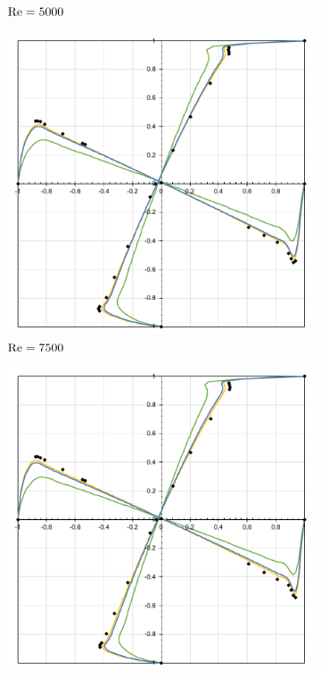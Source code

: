 \begin{figure}[h]
\begin{subfigure}{0.4\textwidth}
    \caption{$\mathrm{Re}=5000$}
    \end{subfigure}
    \begin{subfigure}{0.4\textwidth}
    \includegraphics[width=\linewidth]{Figuras/Cavity/Re7500.pdf}
    \caption{$\mathrm{Re}=7500$}
    \end{subfigure}
    \begin{subfigure}{0.4\textwidth}
    \includegraphics[width=\linewidth]{Figuras/Cavity/Re10000.pdf}

\end{subfigure}
\end{figure}
